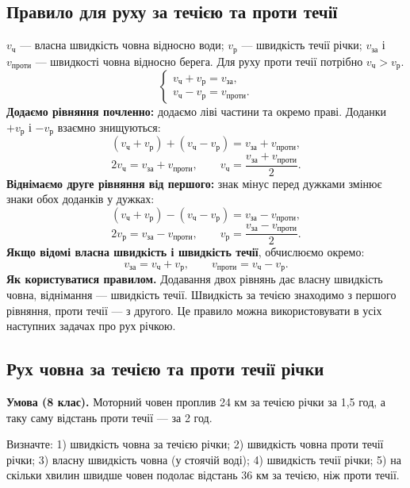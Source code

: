 \documentclass[12pt,a4paper]{article}
\begin{document}
\subsection*{Правило для руху за течією та проти течії}
$v_{\text{ч}}$ --- власна швидкість човна відносно води; $v_{\text{р}}$ --- швидкість течії річки; $v_{\text{за}}$ і $v_{\text{проти}}$ --- швидкості човна відносно берега. Для руху проти течії потрібно $v_{\text{ч}}>v_{\text{р}}$.
\[
\begin{cases}
v_{\text{ч}}+v_{\text{р}}=v_{\text{за}},\\
v_{\text{ч}}-v_{\text{р}}=v_{\text{проти}}.
\end{cases}
\]
\textbf{Додаємо рівняння почленно:} додаємо ліві частини та окремо праві. Доданки $+v_{\text{р}}$ і $-v_{\text{р}}$ взаємно знищуються:
\[
(v_{\text{ч}}+v_{\text{р}})+(v_{\text{ч}}-v_{\text{р}})=v_{\text{за}}+v_{\text{проти}},
\]
\[2v_{\text{ч}}=v_{\text{за}}+v_{\text{проти}},\qquad
v_{\text{ч}}=\frac{v_{\text{за}}+v_{\text{проти}}}{2}.
\]
\textbf{Віднімаємо друге рівняння від першого:} знак мінус перед дужками змінює знаки обох доданків у дужках:
\[
(v_{\text{ч}}+v_{\text{р}})-(v_{\text{ч}}-v_{\text{р}})=v_{\text{за}}-v_{\text{проти}},
\]
\[2v_{\text{р}}=v_{\text{за}}-v_{\text{проти}},\qquad
v_{\text{р}}=\frac{v_{\text{за}}-v_{\text{проти}}}{2}.
\]
\textbf{Якщо відомі власна швидкість і швидкість течії}, обчислюємо окремо:
\[v_{\text{за}}=v_{\text{ч}}+v_{\text{р}},\qquad v_{\text{проти}}=v_{\text{ч}}-v_{\text{р}}.\]
\textbf{Як користуватися правилом.} Додавання двох рівнянь дає власну швидкість човна, віднімання --- швидкість течії. Швидкість за течією знаходимо з першого рівняння, проти течії --- з другого. Це правило можна використовувати в усіх наступних задачах про рух річкою.
\endgroup
\newpage
\subsection*{Рух човна за течією та проти течії річки}
\textbf{Умова (8 клас).} Моторний човен проплив 24 км за течією річки за 1,5 год, а таку саму відстань проти течії --- за 2 год.

Визначте: 1) швидкість човна за течією річки; 2) швидкість човна проти течії річки; 3) власну швидкість човна (у стоячій воді); 4) швидкість течії річки; 5) на скільки хвилин швидше човен подолає відстань 36 км за течією, ніж проти течії.
\end{document}
